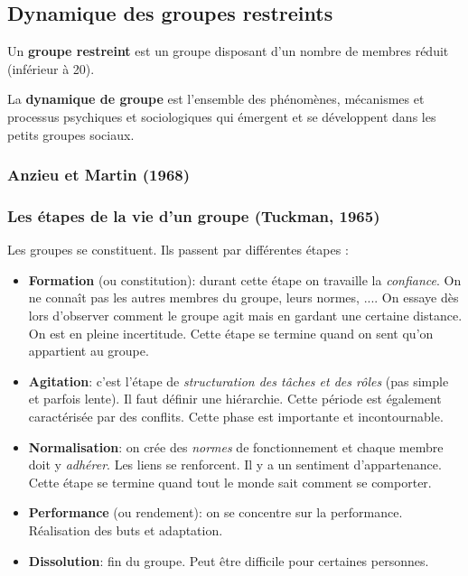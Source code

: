 \documentclass[12pt]{article}
\begin{document}
		
	\subsection{Dynamique des groupes restreints}
	
	Un \textbf{groupe restreint} est un groupe disposant d'un nombre de membres réduit (inférieur à 20). \newline
	
	La \textbf{dynamique de groupe} est l'ensemble des phénomènes, mécanismes et processus psychiques et sociologiques qui émergent et se développent dans les petits groupes sociaux.
	
		\subsubsection{Anzieu et Martin (1968)}
		
		\subsubsection{Les étapes de la vie d’un groupe (Tuckman, 1965)}
		
		Les groupes se constituent. Ils passent par différentes étapes : \newline
		\begin{itemize}
		\item \textbf{Formation} (ou constitution): durant cette étape on travaille la \textit{confiance}. On ne connaît pas les autres membres du groupe, leurs normes, .... On essaye dès lors d'observer comment le groupe agit mais en gardant une certaine distance. On est en pleine incertitude. Cette étape se termine quand on sent qu'on appartient au groupe.
		\item \textbf{Agitation}: c'est l'étape de \textit{structuration des tâches et des rôles} (pas simple et parfois lente). Il faut définir une hiérarchie. Cette période est également caractérisée par des conflits. Cette phase est importante et incontournable.
		\item \textbf{Normalisation}: on crée des \textit{normes} de fonctionnement et chaque membre doit y \textit{adhérer}. Les liens se renforcent. Il y a un sentiment d'appartenance. Cette étape se termine quand tout le monde sait comment se comporter.
		\item \textbf{Performance} (ou rendement): on se concentre sur la performance. Réalisation des buts et adaptation.
		\item \textbf{Dissolution}: fin du groupe. Peut être difficile pour certaines personnes. \newline
		\end{itemize}
		
\end{document}

